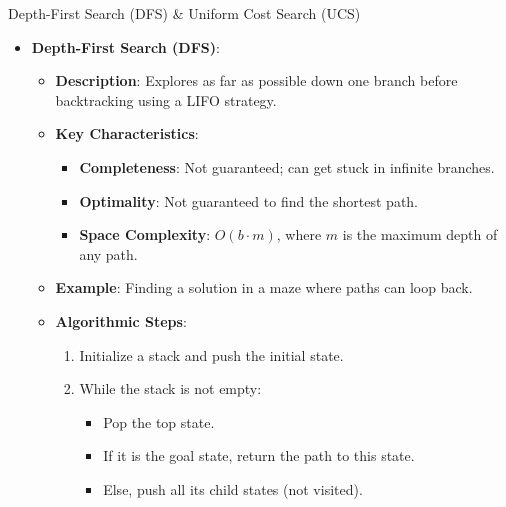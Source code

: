 \documentclass[aspectratio=169]{beamer}
\begin{document}
\begin{frame}[fragile]{Depth-First Search (DFS) \& Uniform Cost Search (UCS)}
    \begin{itemize}
        \item \textbf{Depth-First Search (DFS)}:
            \begin{itemize}
                \item \textbf{Description}: Explores as far as possible down one branch before backtracking using a LIFO strategy.
                \item \textbf{Key Characteristics}:
                    \begin{itemize}
                        \item \textbf{Completeness}: Not guaranteed; can get stuck in infinite branches.
                        \item \textbf{Optimality}: Not guaranteed to find the shortest path.
                        \item \textbf{Space Complexity}: $O(b \cdot m)$, where $m$ is the maximum depth of any path.
                    \end{itemize}
                \item \textbf{Example}: Finding a solution in a maze where paths can loop back.
                \item \textbf{Algorithmic Steps}:
                    \begin{enumerate}
                        \item Initialize a stack and push the initial state.
                        \item While the stack is not empty:
                            \begin{itemize}
                                \item Pop the top state.
                                \item If it is the goal state, return the path to this state.
                                \item Else, push all its child states (not visited).
                            \end{itemize}
                    \end{enumerate}
            \end{itemize}
    \end{itemize}
    

\end{frame}
\end{document}
